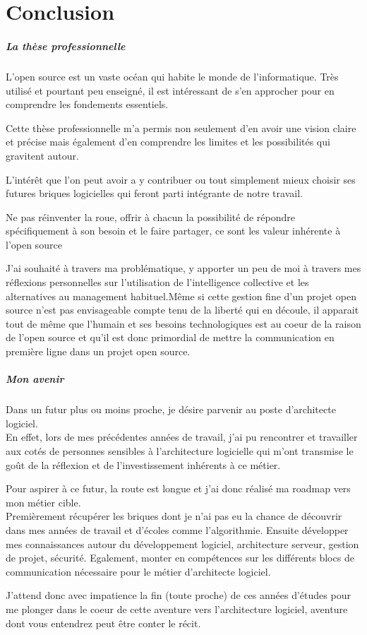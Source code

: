 \chapter{Conclusion}

\paragraph{La thèse professionnelle\\}

	L'open source est un vaste océan qui habite le monde de l'informatique. Très utilisé et pourtant peu enseigné, il est intéressant de s'en approcher pour en comprendre les fondements essentiels. 

	Cette thèse professionnelle m'a permis non seulement d'en avoir une vision claire et précise mais également d'en comprendre les limites et les possibilités qui gravitent autour.

	L'intérêt que l'on peut avoir a y contribuer ou tout simplement mieux choisir ses futures briques logicielles qui feront parti intégrante de notre travail.

	Ne pas réinventer la roue, offrir à chacun la possibilité de répondre spécifiquement à son besoin et le faire partager, ce sont les valeur inhérente à l'open source

	J'ai souhaité à travers ma problématique, y apporter un peu de moi à travers mes réflexions personnelles sur l'utilisation de l'intelligence collective et les alternatives au management habituel.Même si cette gestion fine d'un projet open source n'est pas envisageable compte tenu de la liberté qui en découle, il apparait tout de même que l'humain et ses besoins technologiques est au coeur de la raison de l'open source et qu'il est donc primordial de mettre la communication en première ligne dans un projet open source.

\paragraph{Mon avenir\\}

	Dans un futur plus ou moins proche, je désire parvenir au poste d'architecte logiciel.\\
	En effet, lors de mes précédentes années de travail, j'ai pu rencontrer et travailler aux cotés de personnes sensibles à l'architecture logicielle qui m'ont transmise le goût de la réflexion et de l'investissement inhérents à ce métier.

	Pour aspirer à ce futur, la route est longue et j'ai donc réalisé ma roadmap vers mon métier cible.\\
	Premièrement récupérer les briques dont je n'ai pas eu la chance de découvrir dans mes années de travail et d'écoles comme l'algorithmie.
	Ensuite développer mes connaissances autour du développement logiciel, architecture serveur, gestion de projet, sécurité.
	Egalement, monter en compétences sur les différents blocs de communication nécessaire pour le métier d'architecte logiciel.

	J'attend donc avec impatience la fin (toute proche) de ces années d'études pour me plonger dans le coeur de cette aventure vers l'architecture logiciel, aventure dont vous entendrez peut être conter le récit.